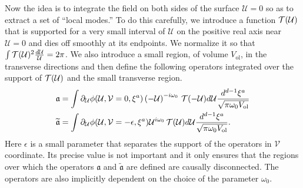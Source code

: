 \documentclass[12pt]{article}
\newcommand{\be}{\begin{equation}}
\newcommand{\ee}{\end{equation}}
\def \anh {\mathfrak{a}}
\def \tildanh {\widetilde{\mathfrak{a}}}
\def\uent{\mathcal{U}}
\def\vent{\mathcal{V}}
\def\xent{\mathcal{\xi}}
\def\tune{{\cal T}}
\def\vol{ V_{\text{ol}}}
\begin{document}
Now the idea is to integrate the field on both sides of the surface $\uent = 0$ so as to extract a set of ``local modes.'' 
To do this carefully, we introduce a function $\tune(\uent)$ that is supported for a very small interval of $\uent$ on the positive real axis near $\uent = 0$ and dies off smoothly at its endpoints. We normalize it so that $\int \tune(\uent)^2 {d \uent \over \uent} = 2 \pi$. We also introduce a small region, of volume $\vol$, in the transverse directions and then define the following operators integrated over the support of $\tune(\uent)$ and the small transverse region.
\be
\label{defnearhormodes}
\begin{split}
&\anh = \int   \partial_{\uent} \phi(\uent, \vent=0, \xent^a) \left(-\uent \right)^{-i \omega_0} \,  \tune(-\uent) d \uent {d^{d-1} \xent^a \over \sqrt{\pi \omega_0 \vol} } \\
&\tildanh =\int  \partial_\uent \phi(\uent,\vent=-\epsilon,\xent^a) \uent^{i \omega_0} \, \tune(\uent) d \uent {d^{d-1} \xent^a \over  \sqrt{\pi \omega_0 \vol}}.
\end{split}
\ee
Here $\epsilon$ is a small parameter that separates the support of the operators in $\vent$ coordinate. Its precise value is not important and it only ensures that the regions over which the operators $\anh$ and $\tildanh$ are defined are causally disconnected.   The operators are also implicitly dependent on the choice of the parameter  $\omega_0$.
\end{document}
